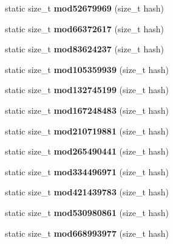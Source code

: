 \begin{DoxyCompactItemize}
\item 
static size\+\_\+t {\bfseries mod52679969} (size\+\_\+t hash)\label{structska_1_1prime__number__hash__policy_a7ae3974a52c376eb8c4736b8aa388d8b}

\item 
static size\+\_\+t {\bfseries mod66372617} (size\+\_\+t hash)\label{structska_1_1prime__number__hash__policy_afca57792ed6a4f497b4939adb24bc5e0}

\item 
static size\+\_\+t {\bfseries mod83624237} (size\+\_\+t hash)\label{structska_1_1prime__number__hash__policy_add30783edec4f53a3b1f388ab9603400}

\item 
static size\+\_\+t {\bfseries mod105359939} (size\+\_\+t hash)\label{structska_1_1prime__number__hash__policy_a18fc27f5802a3bd1b7cdbae04c65c03d}

\item 
static size\+\_\+t {\bfseries mod132745199} (size\+\_\+t hash)\label{structska_1_1prime__number__hash__policy_a0e0257d76a701522349d334e70283c6e}

\item 
static size\+\_\+t {\bfseries mod167248483} (size\+\_\+t hash)\label{structska_1_1prime__number__hash__policy_a890b8930ca9d40f8311205228b003646}

\item 
static size\+\_\+t {\bfseries mod210719881} (size\+\_\+t hash)\label{structska_1_1prime__number__hash__policy_a9b1ffc15af001616baa25f83c98ba4ef}

\item 
static size\+\_\+t {\bfseries mod265490441} (size\+\_\+t hash)\label{structska_1_1prime__number__hash__policy_ab26a11b5d9067e7a70a52cedca329fb2}

\item 
static size\+\_\+t {\bfseries mod334496971} (size\+\_\+t hash)\label{structska_1_1prime__number__hash__policy_a4061c26f2697de407974971095352dba}

\item 
static size\+\_\+t {\bfseries mod421439783} (size\+\_\+t hash)\label{structska_1_1prime__number__hash__policy_a4313f6a84c6e79a9559eaf3756457aee}

\item 
static size\+\_\+t {\bfseries mod530980861} (size\+\_\+t hash)\label{structska_1_1prime__number__hash__policy_abe5cab5659a76347a15aa1246c1f8eb2}

\item 
static size\+\_\+t {\bfseries mod668993977} (size\+\_\+t hash)\label{structska_1_1prime__number__hash__policy_aa7fbf9b6b09f824059cb59475799ba75}


\end{DoxyCompactItemize}
